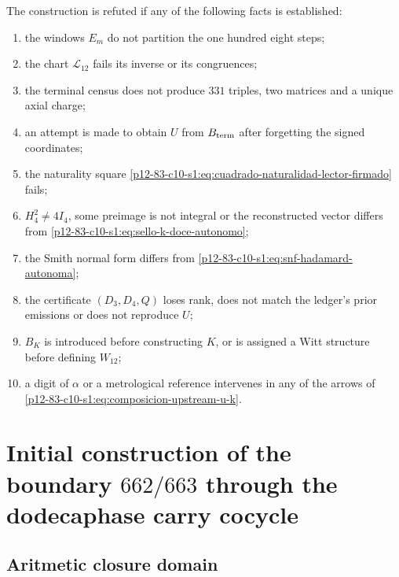 \begin{criterion}
The construction is refuted if any of the following facts
is established:
\begin{enumerate}
 \item the windows \(E_m\) do not partition the one hundred eight steps;
 \item the chart \(\mathcal L_{12}\) fails its inverse or its congruences;
 \item the terminal census does not produce \(331\) triples, two matrices and a unique
       axial charge;
 \item an attempt is made to obtain \(U\) from \(B_{\rm term}\) after forgetting the
       signed coordinates;
 \item the naturality square
       \eqref{p12-83-c10-s1:eq:cuadrado-naturalidad-lector-firmado} fails;
 \item \(H_4^2\neq4I_4\), some preimage is not integral or the
       reconstructed vector differs from \eqref{p12-83-c10-s1:eq:sello-k-doce-autonomo};
 \item the Smith normal form differs from
       \eqref{p12-83-c10-s1:eq:snf-hadamard-autonoma};
 \item the certificate \((D_3,D_4,Q)\) loses rank, does not match the
       ledger’s prior emissions or does not reproduce \(U\);
 \item \(B_K\) is introduced before constructing \(K\), or is assigned a
       Witt structure before defining \(W_{12}\);
 \item a digit of \(\alpha\) or a metrological reference intervenes in
       any of the arrows of \eqref{p12-83-c10-s1:eq:composicion-upstream-u-k}.
\end{enumerate}
\end{criterion}



\section{Initial construction of the boundary \texorpdfstring{\(662/663\)}{662/663} through the dodecaphase carry cocycle}
\label{p12-83-c10-s2:chap:acarreo-alpha-frontera-662-663}

\subsection{Aritmetic closure domain}

